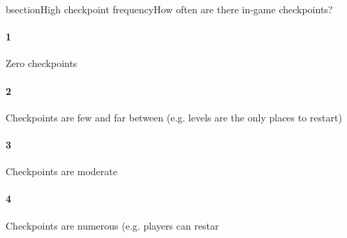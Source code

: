bsection{High checkpoint frequency}How often are there in-game checkpoints?\paragraph{1}Zero checkpoints\paragraph{2}Checkpoints are few and far between (e.g. levels are the only places to restart)\paragraph{3}Checkpoints are moderate\paragraph{4}Checkpoints are numerous (e.g. players can restar